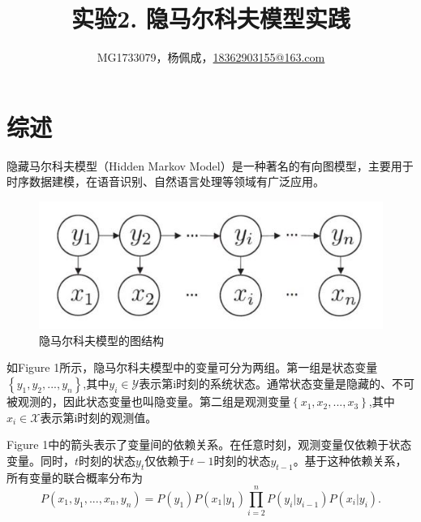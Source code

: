 \documentclass[a4paper,UTF8]{article}
\theoremstyle{definition}
\begin{document}
\title{实验2. 隐马尔科夫模型实践}
\author{MG1733079，杨佩成，\url{18362903155@163.com}}
\maketitle

\section*{综述}
	隐藏马尔科夫模型（Hidden Markov Model）是一种著名的有向图模型，主要用于时序数据建模，在语音识别、自然语言处理等领域有广泛应用。
\begin{figure}[h]
\centering
\small
\includegraphics{1.JPG}
\caption{隐马尔科夫模型的图结构}
\end{figure}

	如Figure 1所示，隐马尔科夫模型中的变量可分为两组。第一组是状态变量 $\left\{ y_1,y_2,...,y_n\right\}$,其中$y_i \in \mathcal{Y}$表示第i时刻的系统状态。通常状态变量是隐藏的、不可被观测的，因此状态变量也叫隐变量。第二组是观测变量$\left\{ x_1,x_2,...,x_3 \right\}$,其中$x_i \in \mathcal{X}$表示第i时刻的观测值。
	
	Figure 1中的箭头表示了变量间的依赖关系。在任意时刻，观测变量仅依赖于状态变量。同时，$t$时刻的状态$y_t$仅依赖于$t-1$时刻的状态$y_{t-1}$。基于这种依赖关系，所有变量的联合概率分布为
\begin{displaymath}
	P(x_1,y_1,...,x_n,y_n)=P(y_1)P(x_1|y_1)\prod_{i=2}^nP(y_i|y_{i-1})P(x_i|y_i).
\end{displaymath}
\end{document}
